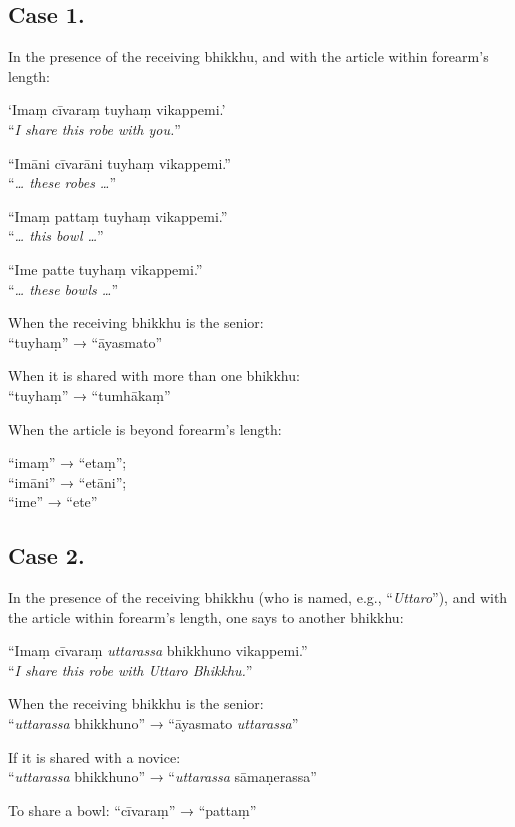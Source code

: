 \subsection{Case 1.}

In the presence of the receiving bhikkhu, and with the article within forearm's length:

‘Imaṃ cīvaraṃ tuyhaṃ vikappemi.’\\
“\emph{I share this robe with you.}”

“Imāni cīvarāni tuyhaṃ vikappemi.”\\
“\emph{\ldots{} these robes \ldots{}}”

“Imaṃ pattaṃ tuyhaṃ vikappemi.”\\
“\emph{\ldots{} this bowl \ldots{}}”

“Ime patte tuyhaṃ vikappemi.”\\
“\emph{\ldots{} these bowls \ldots{}}”

When the receiving bhikkhu is the senior:\\
“tuyhaṃ” → “āyasmato”

When it is shared with more than one bhikkhu:\\
“tuyhaṃ” → “tumhākaṃ”

When the article is beyond forearm’s length:

“imaṃ” → “etaṃ”;\\
“imāni” → “etāni”;\\
“ime” → “ete”


\subsection{Case 2.}

In the presence of the receiving bhikkhu (who is named, e.g., “\emph{Uttaro}”),
and with the article within forearm's length, one says to another bhikkhu:

“Imaṃ cīvaraṃ \emph{uttarassa} bhikkhuno vikappemi.”\\
“\emph{I share this robe with Uttaro Bhikkhu.}”

When the receiving bhikkhu is the senior:\\
“\emph{uttarassa} bhikkhuno” → “āyasmato \emph{uttarassa}”

If it is shared with a novice:\\
“\emph{uttarassa} bhikkhuno” → “\emph{uttarassa} sāmaṇerassa”

To share a bowl: “cīvaraṃ” → “pattaṃ”

